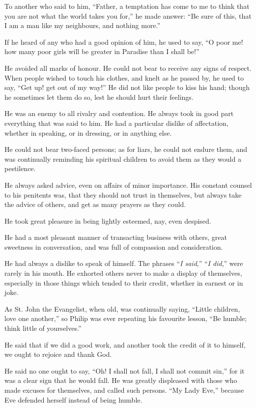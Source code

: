 To another who said to him, ``Father,
a temptation has come to me to think that you are not what the
world takes you for,'' he made answer: ``Be sure of this, that I am a man
like my neighbours, and nothing more.''

If he heard of any who had a
good opinion of him, he used to say, ``O poor me! how many poor girls
will be greater in Paradise than I shall be!''

He avoided all marks of honour.
He could not bear to receive any signs of respect. When people wished to
touch his clothes, and knelt as he passed by, he used to say, ``Get up!
get out of my way!'' He did not like people to kiss his hand; though he
sometimes let them do so, lest he should hurt their feelings.

He was an enemy to all rivalry
and contention. He always took in good part everything that was said to
him. He had a particular dislike of affectation, whether in speaking, or
in dressing, or in anything else.

He could not bear two-faced
persons; as for liars, he could not endure them, and was continually
reminding his spiritual children to avoid them as they would a
pestilence.

He always asked advice, even on
affairs of minor importance. His constant counsel to his penitents was,
that they should not trust in themselves, but always take the advice of
others, and get as many prayers as they could.

He took great pleasure in being
lightly esteemed, nay, even despised.

He had a most pleasant manner of
transacting business with others, great sweetness in conversation, and
was full of compassion and consideration.

He had always a dislike to speak
of himself. The phrases ``\emph{I said},'' ``\emph{I did},'' were rarely in
his mouth. He exhorted others never to make a display of themselves,
especially in those things which tended to their credit, whether in
earnest or in joke.

As St. John the Evangelist, when
old, was continually saying, ``Little children, love one another,'' so
Philip was ever repeating his favourite lesson, ``Be humble; think little
of yourselves.''

He said that if we did a good
work, and another took the credit of it to himself, we ought to rejoice
and thank God.

He said no one ought to say, ``Oh!
I shall not fall, I shall not commit sin,'' for it was a clear sign that
he would fall. He was greatly displeased with those who made excuses for
themselves, and called such persons. ``My Lady Eve,'' because Eve defended
herself instead of being humble.

